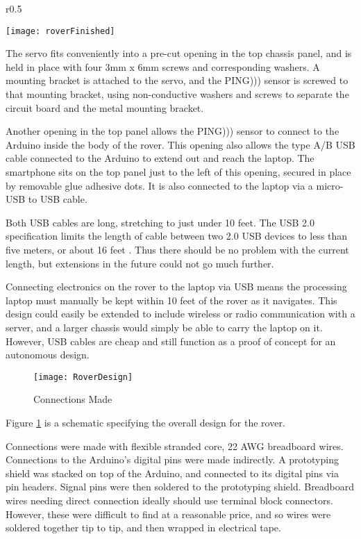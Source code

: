 \begin{wrapfigure}{r}{0.5\textwidth}
	\caption{Construction Finished}
	\centering
	\texttt{[image: roverFinished]}
	\label{FigRoverFinished}
\end{wrapfigure}

The servo fits conveniently into a pre-cut opening in the top chassis panel, and is held in place with four 3mm x 6mm screws and corresponding washers. A mounting bracket is attached to the servo, and the PING))) sensor is screwed to that mounting bracket, using non-conductive washers and screws to separate the circuit board and the metal mounting bracket.

Another opening in the top panel allows the PING))) sensor to connect to the Arduino inside the body of the rover. This opening also allows the type A/B USB cable connected to the Arduino to extend out and reach the laptop. The smartphone sits on the top panel just to the left of this opening, secured in place by removable glue adhesive dots. It is also connected to the laptop via a micro-USB to USB cable.

Both USB cables are long, stretching to just under 10 feet. The USB 2.0 specification limits the length of cable between two 2.0 USB devices to less than five meters, or about 16 feet \cite{usbForum}. Thus there should be no problem with the current length, but extensions in the future could not go much further. 

Connecting electronics on the rover to the laptop via USB means the processing laptop must manually be kept within 10 feet of the rover as it navigates. This design could easily be extended to include wireless or radio communication with a server, and a larger chassis would simply be able to carry the laptop on it. However, USB cables are cheap and still function as a proof of concept for an autonomous design.

\begin{figure}[p] 
	\caption{Connections Made}
	\texttt{[image: RoverDesign]}
	\centering
	\label{figRoverDesign}
\end{figure}

Figure \ref{figRoverDesign} is a schematic specifying the overall design for the rover.

Connections were made with flexible stranded core, 22 AWG breadboard wires. Connections to the Arduino's digital pins were made indirectly. A prototyping shield was stacked on top of the Arduino, and connected to its digital pins via pin headers. Signal pins were then soldered to the prototyping shield. Breadboard wires needing direct connection ideally should use terminal block connectors. However, these were difficult to find at a reasonable price, and so wires were soldered together tip to tip, and then wrapped in electrical tape.

